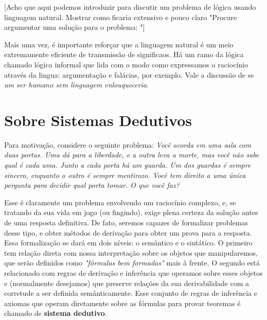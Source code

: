 [Acho que aqui podemos introduzir para discutir um problema de lógica usando linguagem natural. Mostrar como ficaria extensivo e pouco claro "Procure argumentar uma solução para o problema: "]

Mais uma vez, é importante reforçar que a linguagem natural é um meio extremamente eficiente de transmissão de significaos.
Há um ramo da lógica chamado lógica informal que lida com o modo como expressamos o raciocínio através da lingua: argumentação e falácias, por exemplo.
Vale a discussão de se \textit{um ser humano sem linguagem enlouqueceria}.

\section{Sobre Sistemas Dedutivos}
Para motivação, considere o seguinte problema: \textit{Você acorda em uma sala com duas portas. Uma dá para a liberdade, e a outra leva a morte, mas você não sabe qual é cada uma.
Junto a cada porta há um guarda. Um dos guardas é sempre sincero, enquanto o outro é sempre mentirozo. Você tem direito a uma única pergunta para decidir qual porta tomar. O que você faz?}

Esse é claramente um problema envolvendo um raciocínio complexo, e, se tratando da sua vida em jogo (ou fingindo), exige plena certeza da solução antes de uma resposta definitiva.
De fato, seremos capazes de formalizar problemas desse tipo, e obter métodos de derivação para obter um prova para a resposta. Essa formalização se dará em dois níveis: o semântico e o sintático. O primeiro tem relação direta com nossa interpretação sobre os objetos que manipularemos, que serão definidos como \textit{"fórmulas bem formadas"} mais à frente. O segundo está relacionado com regras de derivação e inferência que operamos sobre esses objetos e (normalmente desejamos) que preserve relações da sua derivabilidade com a corretude a ser definida semânticamente. Esse conjunto de regras de inferência e axiomas que operam diretamente sobre as fórmulas para provar teoremas é chamado de \textbf{sistema dedutivo}.

